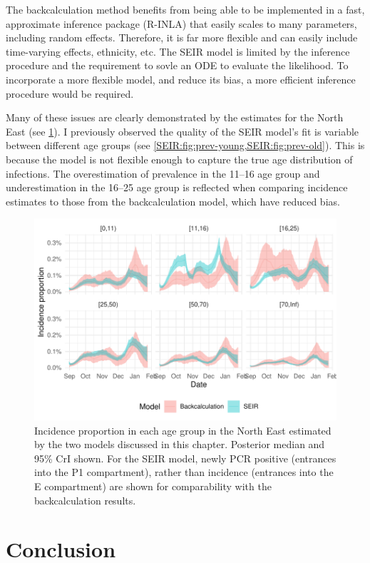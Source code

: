 \documentclass[thesis.tex]{subfiles}
\begin{document}
The backcalculation method benefits from being able to be implemented in a fast, approximate inference package (R-INLA) that easily scales to many parameters, including random effects.
Therefore, it is far more flexible and can easily include time-varying effects, ethnicity, etc.
The SEIR model is limited by the inference procedure and the requirement to sovle an ODE to evaluate the likelihood.
To incorporate a more flexible model, and reduce its bias, a more efficient inference procedure would be required.

Many of these issues are clearly demonstrated by the estimates for the North East (see \cref{transmission:fig:compare-NE}).
I previously observed the quality of the SEIR model's fit is variable between different age groups (see \cref{SEIR:fig:prev-young,SEIR:fig:prev-old}).
This is because the model is not flexible enough to capture the true age distribution of infections.
The overestimation of prevalence in the 11--16 age group and underestimation in the 16--25 age group is reflected when comparing incidence estimates to those from the backcalculation model, which have reduced bias.
\begin{figure}
    \centering \includegraphics{transmission/compare-NE}
    \caption[Comparing each models estimate of North East incidence by age.]{%
        Incidence proportion in each age group in the North East estimated by the two models discussed in this chapter.
        Posterior median and 95\% CrI shown.
        For the SEIR model, newly PCR positive (entrances into the P1 compartment), rather than incidence (entrances into the E compartment) are shown for comparability with the backcalculation results.
    }
    \label{transmission:fig:compare-NE}
\end{figure}


\section{Conclusion}


\ifSubfilesClassLoaded{
  \listoftodos
}{}
\end{document}
